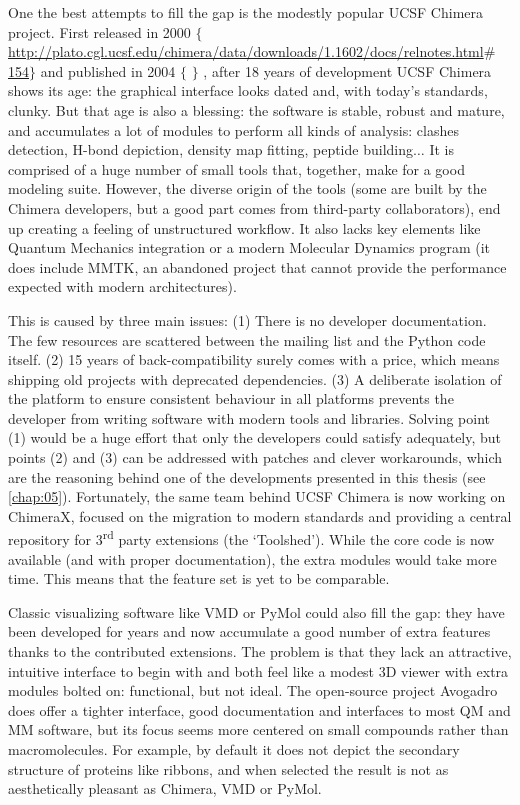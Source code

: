 One the best attempts to fill the gap is the modestly popular UCSF Chimera project. First released in 2000 $ \{ $  \href{http://plato.cgl.ucsf.edu/chimera/data/downloads/1.1602/docs/relnotes.html}{http://plato.cgl.ucsf.edu/chimera/data/downloads/1.1602/docs/relnotes.html$\#$ 154}$ \} $  and published in 2004 $ \{ $ $ \} $ , after 18 years of development UCSF Chimera shows its age: the graphical interface looks dated and, with today’s standards, clunky. But that age is also a blessing: the software is stable, robust and mature, and accumulates a lot of modules to perform all kinds of analysis: clashes detection, H-bond depiction, density map fitting, peptide building$ \ldots $  It is comprised of a huge number of small tools that, together, make for a good modeling suite. However, the diverse origin of the tools (some are built by the Chimera developers, but a good part comes from third-party collaborators), end up creating a feeling of unstructured workflow. It also lacks key elements like Quantum Mechanics integration or a modern Molecular Dynamics program (it does include MMTK, an abandoned project that cannot provide the performance expected with modern architectures).

This is caused by three main issues: (1) There is no developer documentation. The few resources are scattered between the mailing list and the Python code itself. (2) 15 years of back-compatibility surely comes with a price, which means shipping old projects with deprecated dependencies. (3) A deliberate isolation of the platform to ensure consistent behaviour in all platforms prevents the developer from writing software with modern tools and libraries. Solving point (1) would be a huge effort that only the developers could satisfy adequately, but points (2) and (3) can be addressed with patches and clever workarounds, which are the reasoning behind one of the developments presented in this thesis (see \autoref{chap:05}). Fortunately, the same team behind UCSF Chimera is now working on ChimeraX, focused on the migration to modern standards and providing a central repository for 3\textsuperscript{rd} party extensions (the ‘Toolshed’). While the core code is now available (and with proper documentation), the extra modules would take more time. This means that the feature set is yet to be comparable.

Classic visualizing software like VMD or PyMol could also fill the gap: they have been developed for years and now accumulate a good number of extra features thanks to the contributed extensions. The problem is that they lack an attractive, intuitive interface to begin with and both feel like a modest 3D viewer with extra modules bolted on: functional, but not ideal. The open-source project Avogadro does offer a tighter interface, good documentation and interfaces to most QM and MM software, but its focus seems more centered on small compounds rather than macromolecules. For example, by default it does not depict the secondary structure of proteins like ribbons, and when selected the result is not as aesthetically pleasant as Chimera, VMD or PyMol.


